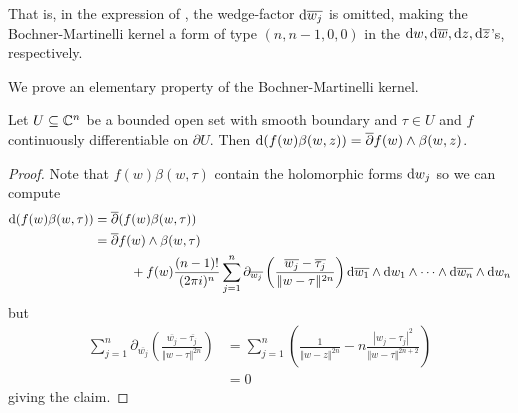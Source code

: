 \begin{remark}
    That is, in the expression of , the wedge-factor $\mathrm{d} \overline{w_{j}}$ is omitted, making the Bochner-Martinelli kernel a form of type $(n,n-1,0,0)$ in the $\mathrm{d} w, \mathrm{d}\overline{w}, \mathrm{d} z,\mathrm{d} \overline{z}$'s, respectively. 
\end{remark}
We prove an elementary property of the Bochner-Martinelli kernel. 
\begin{lemma}\label{lem: Bochner-Martinelli computation}
    Let $U\subseteq\mathbb{C}^{n}$ be a bounded open set with smooth boundary and $\tau\in U$ and $f$ continuously differentiable on $\partial U$. Then $\mathrm{d}(f(w)\beta(w,z))=\overline{\partial}f(w)\wedge \beta(w,z)$. 
\end{lemma}
\begin{proof}
    Note that $f(w)\beta(w,\tau)$ contain the holomorphic forms $\mathrm{d} w_{j}$ so we can compute 
    \footnotesize
    \begin{align*}
        \mathrm{d}(f(w)\beta(w,\tau)) &= \overline{\partial}(f(w)\beta(w,\tau)) \\
        &= \overline{\partial}f(w)\wedge \beta(w,\tau) \\
        &\hspace{1cm}+ f(w)\frac{(n-1)!}{(2\pi i)^{n}}\sum_{j=1}^{n}\partial_{\overline{w_{j}}}\left(\frac{\overline{w_{j}}-\overline{\tau_{j}}}{\Vert w-\tau\Vert^{2n}}\right)\mathrm{d}\overline{w_{1}}\wedge\mathrm{d} w_{1}\wedge\dots\wedge\mathrm{d}\overline{w_{n}}\wedge\mathrm{d} w_{n}
    \end{align*}
    \large
    but
    \begin{align*}
        \sum_{j=1}^{n}\partial_{\overline{w_{j}}}\left(\frac{\overline{w_{j}}-\overline{\tau_{j}}}{\Vert w-\tau\Vert^{2n}}\right) &= \sum_{j=1}^{n}\left(\frac{1}{\Vert w-z\Vert^{2n}}-n\frac{|w_{j}-\tau_{j}|^{2}}{\Vert w-\tau\Vert^{2n+2}}\right) \\
        &= 0
    \end{align*}
    giving the claim. 
\end{proof}